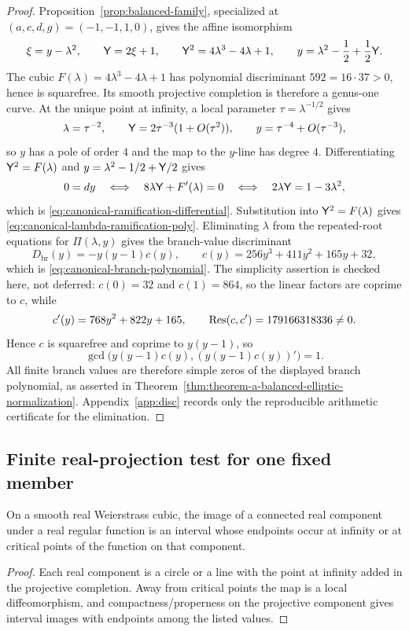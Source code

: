 \begin{proof}
Proposition~\ref{prop:balanced-family}, specialized at $(a,c,d,g)=(-1,-1,1,0)$, gives the affine isomorphism
\[
\xi=y-\lambda^2,
\qquad
\mathsf{Y}=2\xi+1,
\qquad
\mathsf{Y}^2=4\lambda^3-4\lambda+1,
\qquad
 y=\lambda^2-\frac12+\frac12\mathsf{Y}.
\]
The cubic $F(\lambda)=4\lambda^3-4\lambda+1$ has polynomial discriminant $592=16\cdot37>0$, hence is squarefree.  Its smooth projective completion is therefore a genus-one curve.  At the unique point at infinity, a local parameter $\tau=\lambda^{-1/2}$ gives
\[
\lambda=\tau^{-2},
\qquad
\mathsf{Y}=2\tau^{-3}(1+O(\tau^2)),
\qquad
 y=\tau^{-4}+O(\tau^{-3}),
\]
so $y$ has a pole of order $4$ and the map to the $y$-line has degree $4$.
Differentiating $\mathsf{Y}^2=F(\lambda)$ and $y=\lambda^2-1/2+\mathsf{Y}/2$ gives
\[
0=dy
\quad\Longleftrightarrow\quad
8\lambda\mathsf{Y}+F'(\lambda)=0
\quad\Longleftrightarrow\quad
2\lambda\mathsf{Y}=1-3\lambda^2,
\]
which is \eqref{eq:canonical-ramification-differential}.  Substitution into $\mathsf{Y}^2=F(\lambda)$ gives \eqref{eq:canonical-lambda-ramification-poly}.  Eliminating $\lambda$ from the repeated-root equations for $\Pi(\lambda,y)$ gives the branch-value discriminant
\[
D_{\mathrm{br}}(y)=-y(y-1)c(y),
\qquad
c(y)=256y^3+411y^2+165y+32,
\]
which is \eqref{eq:canonical-branch-polynomial}.  The simplicity assertion is checked here, not deferred: $c(0)=32$ and $c(1)=864$, so the linear factors are coprime to $c$, while
\[
c'(y)=768y^2+822y+165,
\qquad
\operatorname{Res}(c,c')=179166318336\ne0.
\]
Hence $c$ is squarefree and coprime to $y(y-1)$, so
\[
\gcd\bigl(y(y-1)c(y),(y(y-1)c(y))'\bigr)=1.
\]
All finite branch values are therefore simple zeros of the displayed branch polynomial, as asserted in Theorem~\ref{thm:theorem-a-balanced-elliptic-normalization}.  Appendix~\ref{app:disc} records only the reproducible arithmetic certificate for the elimination.
\end{proof}

\subsection{Finite real-projection test for one fixed member}

\begin{lemma}\label{lem:real-weierstrass-oval-covering-count}
On a smooth real Weierstrass cubic, the image of a connected real component under a real regular function is an interval whose endpoints occur at infinity or at critical points of the function on that component.
\end{lemma}
\begin{proof}
Each real component is a circle or a line with the point at infinity added in the projective completion.  Away from critical points the map is a local diffeomorphism, and compactness/properness on the projective component gives interval images with endpoints among the listed values.
\end{proof}

